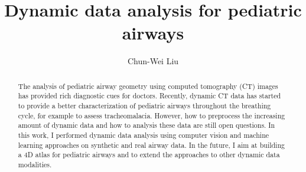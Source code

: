 \documentclass{article}
\begin{document}
%
%
%
%
\title{Dynamic data analysis for pediatric airways}
%
%
\author{Chun-Wei Liu}
%
%
%


\maketitle              %

\begin{abstract}
The analysis of pediatric airway geometry using computed tomography (CT) images has provided rich diagnostic cues for doctors. Recently, dynamic CT data has started to provide a better characterization of pediatric airways throughout the breathing cycle, for example to assess tracheomalacia. However, how to preprocess the increasing amount of dynamic data and how to analysis these data are still open questions. In this work, I performed dynamic data analysis using computer vision and machine learning approaches on synthetic and real airway data. In the future, I aim at building a 4D atlas for pediatric airways and to extend the approaches to other dynamic data modalities.
\end{abstract}








\end{document}
